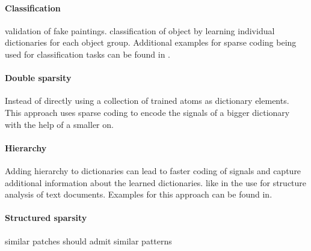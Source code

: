 
\paragraph{Classification} \cite{?} validation of fake paintings. 
\cite{?} classification of object by learning  individual dictionaries for each
object group. Additional examples for sparse coding  being used for
classification tasks can be found in
\cite{Raina2007,BradleyBagnel2009,Mairal2008,Mairal2008b,Bar2009,Yang2009}.



\paragraph{Double sparsity}
Instead of directly using a collection of trained atoms as dictionary
elements. This approach uses sparse coding to encode the signals of a bigger
dictionary with the help of a smaller on.\cite{Rubinstein2009} 


\paragraph{Hierarchy}
Adding hierarchy to dictionaries can lead to faster coding of signals and
capture additional information about the learned dictionaries. like in the use
for structure analysis of text documents. Examples for this approach can be
found in\cite{Jenatton2010}.


\paragraph{Structured sparsity}
similar patches should admit similar patterns \cite{Mairal2009} 
\cite{group sparsity}





